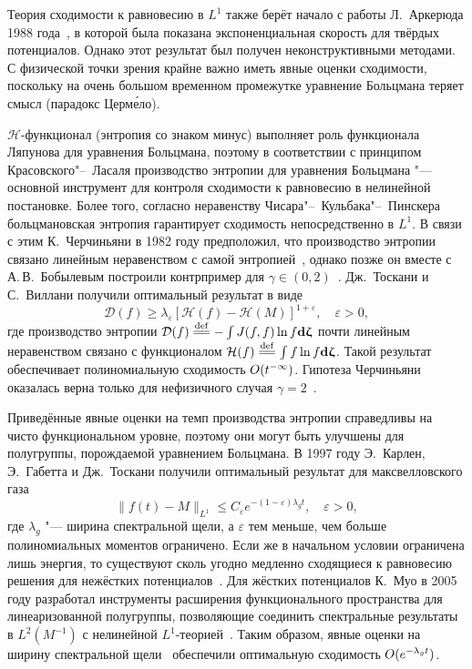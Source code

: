 Теория сходимости к равновесию в \(L^1\) также берёт начало с работы Л.~Аркерюда 1988 года~\cite{Arkeryd1988},
в которой была показана экспоненциальная скорость для твёрдых потенциалов.
Однако этот результат был получен неконструктивными методами.
С физической точки зрения крайне важно иметь явные оценки сходимости, поскольку на очень большом временном промежутке
уравнение Больцмана теряет смысл (парадокс Церм\'{е}ло).

\(\mathcal{H}\)-функционал (энтропия со знаком минус) выполняет роль функционала Ляпунова для уравнения Больцмана,
поэтому в соответствии с принципом Красовского"--~Ласаля производство энтропии для уравнения Больцмана
"--- основной инструмент для контроля сходимости к равновесию в нелинейной постановке.
Более того, согласно неравенству Чисара"--~Кульбака"--~Пинскера больцмановская энтропия
гарантирует сходимость непосредственно в \(L^1\).
В связи с этим К.~Черчиньяни в 1982 году предположил, что производство энтропии связано
линейным неравенством с самой энтропией~\cite{Cercignani1982, Desvillettes2011},
однако позже он вместе с А.\,В.~Бобылевым построили контрпример для \(\gamma\in(0,2)\)~\cite{Bobylev1999}.
Дж.~Тоскани и С.~Виллани получили оптимальный результат в виде~\cite{Toscani1999, Toscani2000, Villani2003}
\begin{equation*}
    \mathcal{D}(f) \geq \lambda_\varepsilon \left[ \mathcal{H}(f) - \mathcal{H}(M) \right]^{1+\varepsilon},
    \quad \varepsilon > 0,
\end{equation*}
где производство энтропии \(\mathcal{D}(f) \eqdef -\int J(f,f) \ln f \dzeta\) почти линейным неравенством связано
с функционалом \(\mathcal{H}(f) \eqdef \int f\ln f \dzeta\).
Такой результат обеспечивает полиномиальную сходимость \(O(t^{-\infty})\).
Гипотеза Черчиньяни оказалась верна только для нефизичного случая \(\gamma=2\)~\cite{Villani2003}.

Приведённые явные оценки на темп производства энтропии справедливы на чисто функциональном уровне,
поэтому они могут быть улучшены для полугруппы, порождаемой уравнением Больцмана.
В 1997 году Э.~Карлен, Э.~Габетта и Дж.~Тоскани получили оптимальный результат для максвелловского газа~\cite{Carlen1999}
\begin{equation*}
    \|f(t) - M\|_{L^1} \leq C_\varepsilon e^{-(1-\varepsilon)\lambda_g t}, \quad \varepsilon > 0,
\end{equation*}
где \(\lambda_g\) "--- ширина спектральной щели, а \(\varepsilon\) тем меньше,
чем больше полиномиальных моментов ограничено.
Если же в начальном условии ограничена лишь энергия, то существуют сколь угодно медленно сходящиеся к равновесию
решения для нежёстких потенциалов~\cite{Carlen2003, Carlen2009}.
Для жёстких потенциалов К.~Муо в 2005 году разработал инструменты расширения функционального пространства для линеаризованной полугруппы,
позволяющие соединить спектральные результаты в \(L^2(M^{-1})\) с нелинейной \(L^1\)-теорией~\cite{Mouhot2006}.
Таким образом, явные оценки на ширину спектральной щели~\cite{Baranger2005}
обеспечили оптимальную сходимость \(O(e^{-\uplambda_g t})\).

